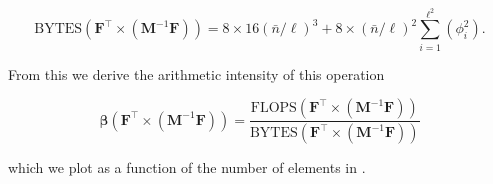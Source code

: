 \begin{equation}
	\text{BYTES}(\textbf{F}^{\intercal} \times (\textbf{M}^{-1}\textbf{F})) = 8 \times 16 (\bar{n}/\ell)^3 + 8 \times (\bar{n}/\ell)^2 \sum_{i=1}^{\ell^2} (\phi_i^2).
	\label{eqn:bytes_fmf}
\end{equation}

\noindent 
From this we derive the arithmetic intensity of this operation  

\begin{equation}
	\symbf{\beta}(\textbf{F}^{\intercal} \times (\textbf{M}^{-1}\textbf{F})) = \frac{\text{FLOPS}(\textbf{F}^{\intercal} \times (\textbf{M}^{-1}\textbf{F}))}{\text{BYTES}(\textbf{F}^{\intercal} \times (\textbf{M}^{-1}\textbf{F}))}
\end{equation}

\noindent
which we plot as a function of the number of elements in .



%		


